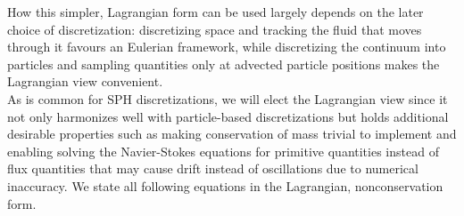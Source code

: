 How this simpler, Lagrangian form can be used largely depends on the later choice of discretization: discretizing space and tracking the fluid that moves through it favours an Eulerian framework, while discretizing the continuum into particles and sampling quantities only at advected particle positions makes the Lagrangian view convenient.\\
As is common for SPH discretizations, we will elect the Lagrangian view since it not only harmonizes well with particle-based discretizations but holds additional desirable properties such as making conservation of mass trivial to implement and enabling solving the Navier-Stokes equations for primitive quantities instead of flux quantities that may cause drift instead of oscillations due to numerical inaccuracy. We state all following equations in the Lagrangian, nonconservation form.

